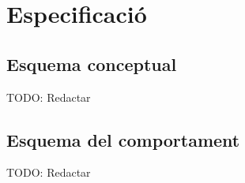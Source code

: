 
\chapter{Especificació} %

\label{Chapter5} %


\section{Esquema conceptual}

TODO: Redactar


\section{Esquema del comportament}

TODO: Redactar